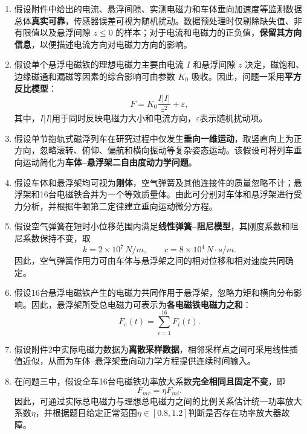 \documentclass[a4paper]{nmmcm}
\begin{document}
\begin{enumerate}
  \item 假设附件中给出的电流、悬浮间隙、实测电磁力和车体垂向加速度等监测数据总体\textbf{真实可靠}，传感器误差可视为随机扰动。数据预处理时仅剔除缺失值、非有限值以及悬浮间隙 $z\leq 0$ 的样本；对于电流和电磁力的正负值，\textbf{保留其方向信息}，以便描述电流方向对电磁力方向的影响。

  \item 假设单个悬浮电磁铁的理想电磁力主要由电流 $I$ 和悬浮间隙 $z$ 决定，磁饱和、边缘磁通和漏磁等因素的综合影响可由参数 $K_0$ 吸收。因此，问题一采用\textbf{平方反比模型}：
  \begin{equation}
  F=K_0\frac{I|I|}{z^2}+\varepsilon,
  \end{equation}
  其中，$I|I|$用于同时反映电磁力大小和电流方向，$\varepsilon$表示随机扰动项。

  \item 假设单节抱轨式磁浮列车在研究过程中仅发生\textbf{垂向一维运动}，取竖直向上为正方向，忽略滚转、俯仰、偏航和横向振动等复杂姿态运动。该假设可将列车垂向运动简化为\textbf{车体--悬浮架二自由度动力学问题}。

  \item 假设车体和悬浮架均可视为\textbf{刚体}，空气弹簧及其他连接件的质量忽略不计；悬浮架和16台电磁铁合并为一个等效质量体。由此可分别对车体和悬浮架进行受力分析，并根据牛顿第二定律建立垂向运动微分方程。

  \item 假设空气弹簧在短时小位移范围内满足\textbf{线性弹簧--阻尼模型}，其刚度系数和阻尼系数保持不变，取
  \begin{equation}
  k=2\times 10^7\,N/m,\qquad
  c=8\times 10^4\,N\cdot s/m.
  \end{equation}
  因此，空气弹簧作用力可由车体与悬浮架之间的相对位移和相对速度共同确定。

  \item 假设16台悬浮电磁铁产生的电磁力共同作用于悬浮架，忽略力矩和横向分布影响。因此，悬浮架所受总电磁力可表示为\textbf{各电磁铁电磁力之和}：
  \begin{equation}
  F_e(t)=\sum_{i=1}^{16}F_i(t).
  \end{equation}

  \item 假设附件2中实际电磁力数据为\textbf{离散采样数据}，相邻采样点之间可采用线性插值近似，从而为车体--悬浮架垂向动力学方程提供连续时间输入。

  \item 在问题三中，假设全车16台电磁铁功率放大系数\textbf{完全相同且固定不变}，即
  \begin{equation}
  F_{mr}=\eta F_{mi}.
  \end{equation}
  因此，可通过实际总电磁力与理想总电磁力之间的比例关系估计统一功率放大系数$\eta$，并根据题目给定正常范围$\eta\in[0.8,1.2]$判断是否存在功率放大器故障。


\end{enumerate}
\end{document}

